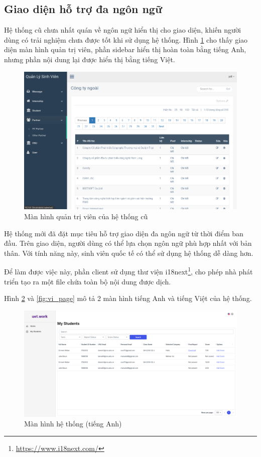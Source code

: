 \documentclass[./../main.tex]{subfiles}
\begin{document}
\hypertarget{ux111a-nguxf4n-ngux1eef-1}{%
	\subsection{Giao diện hỗ trợ đa ngôn ngữ}\label{ux111a-nguxf4n-ngux1eef-1}}


Hệ thống cũ chưa nhất quán về ngôn ngữ hiển thị cho giao diện, khiến người dùng có trải nghiệm chưa được tốt khi sử dụng hệ thống. Hình \ref{fig:old_admin_page} cho thấy giao diện màn hình quản trị viên, phần sidebar hiển thị hoàn toàn bằng tiếng Anh, nhưng phần nội dung lại được hiển thị bằng tiếng Việt.

\begin{figure}[]
	\includegraphics[width=\linewidth]{./images/old_admin_page.png}
	\caption{Màn hình quản trị viên của hệ thống cũ}
	\label{fig:old_admin_page}
\end{figure}

Hệ thống mới đã đặt mục tiêu hỗ trợ giao diện đa ngôn ngữ từ thời điểm ban đầu. Trên giao diện, người dùng có thể lựa chọn ngôn ngữ phù hợp nhất với bản
thân. Với tính năng này, sinh viên quốc tế có thể sử dụng hệ thống dễ dàng hơn.

Để làm được việc này, phần client sử dụng thư viện i18next\footnote{\url{https://www.i18next.com/}}, cho phép nhà phát triển tạo ra một file chứa toàn bộ nội dung được dịch.

Hình \ref{fig:en_page} và \ref{fig:vi_page} mô tả 2 màn hình tiếng Anh và tiếng Việt của hệ thống.

\begin{figure}[]
	\includegraphics[width=\linewidth]{./images/image13.png}
	\caption{Màn hình hệ thống (tiếng Anh)}
	\label{fig:en_page}
\end{figure}
\end{document}
